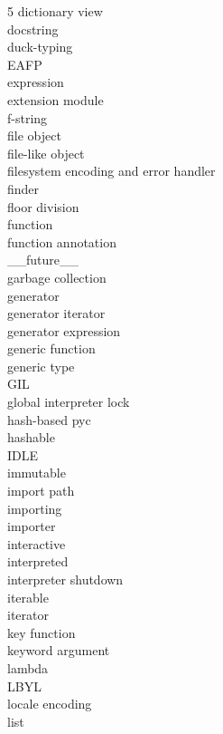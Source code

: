 \documentclass [8pt] {extarticle}
\begin{document}
\begin {multicols} {5}
        dictionary view \\
        docstring \\
        duck-typing \\
        EAFP \\
        expression \\
        extension module \\
        f-string \\
        file object \\
        file-like object \\
        filesystem encoding and error handler \\
        finder \\
        floor division \\
        function \\
        function annotation \\
        \_\_future\_\_ \\
        garbage collection \\
        generator \\
        generator iterator \\
        generator expression \\
        generic function \\
        generic type \\
        GIL \\
        global interpreter lock \\
        hash-based pyc \\
        hashable \\
        IDLE \\
        immutable \\
        import path \\
        importing \\
        importer \\
        interactive \\
        interpreted \\
        interpreter shutdown \\
        iterable \\
        iterator \\
        key function \\
        keyword argument \\
        lambda \\
        LBYL \\
        locale encoding \\
        list \\

\end{multicols}
\end{document}
